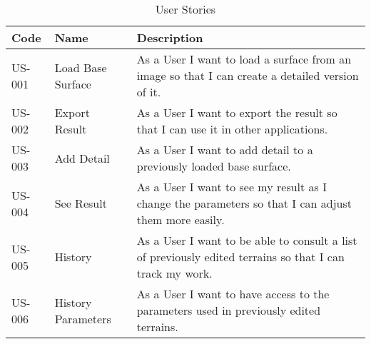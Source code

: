\begin{table}[h!]
  \centering
  \renewcommand{\arraystretch}{1.5}
  \footnotesize{
    \begin{tabularx}{\linewidth}{|l|l|b|}
	  \hline
      \textbf{Code} & \textbf{Name} & \textbf{Description} \\ \hline
      US-001 & Load Base Surface & As a User I want to load a surface from an image so that I can create a detailed version of it. \\ \hline
      US-002 & Export Result & As a User I want to export the result so that I can use it in other applications. \\ \hline
      US-003 & Add Detail & As a User I want to add detail to a previously loaded base surface. \\ \hline
      US-004 & See Result & As a User I want to see my result as I change the parameters so that I can adjust them more easily. \\ \hline
      US-005 & History & As a User I want to be able to consult a list of previously edited terrains so that I can track my work. \\ \hline
      US-006 & History Parameters & As a User I want to have access to the parameters used in previously edited terrains. \\ \hline   
    \end{tabularx}
  }
  \caption{User Stories}
  \label{table:user_stories}
\end{table}
